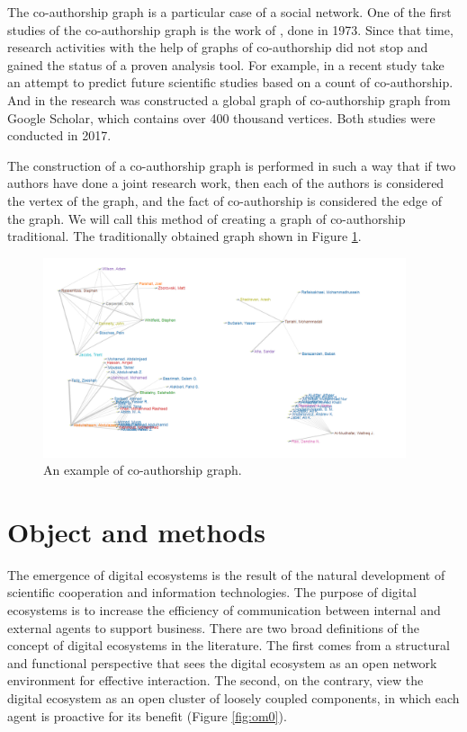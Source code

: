 \documentclass[12pt]{report}
\theoremstyle{definition}
\begin{document}
The co-authorship graph is a particular case of a social network. 
One of the first studies of the co-authorship graph is the work of \cite{mullins1973development}, done in 1973. 
Since that time, research activities with the help of graphs of co-authorship did not stop and gained the status of a proven analysis tool. 
For example, in a recent study \cite{chuan2018link} take an attempt to predict future scientific studies based on a count of co-authorship. 
And in the research \cite{chen2017building} was constructed a global graph of co-authorship graph from Google Scholar, which contains over 400 thousand vertices. 
Both studies were conducted in 2017.

The construction of a co-authorship graph is performed in such a way that if two authors have done a joint research work, then each of the authors is considered the vertex of the graph, and the fact of co-authorship is considered the edge of the graph. 
We will call this method of creating a graph of co-authorship traditional. 
The traditionally obtained graph shown in Figure \ref{fig:rev1}.

\begin{figure}[ht]
	\centering
	\includegraphics[width=0.95\textwidth]{rev1}
	\caption{An example of co-authorship graph.}
	\label{fig:rev1}
\end{figure}

\section{Object and methods}
\label{cha:objectandmethod}
The emergence of digital ecosystems is the result of the natural development of scientific cooperation and information technologies. 
The purpose of digital ecosystems is to increase the efficiency of communication between internal and external agents to support business. 
There are two broad definitions of the concept of digital ecosystems in the literature. 
The first comes from a structural and functional perspective that sees the digital ecosystem as an open network environment for effective interaction. The second, on the contrary, view the digital ecosystem as an open cluster of loosely coupled components, in which each agent is proactive for its benefit (Figure \ref{fig:om0}).
\end{document}
